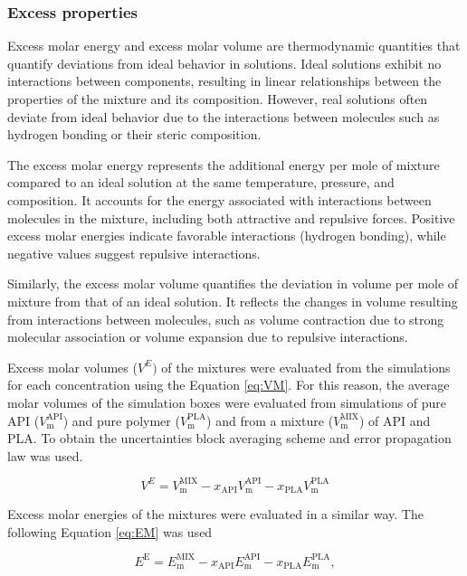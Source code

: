 \newpage
\subsubsection{Excess properties}
Excess molar energy and excess molar volume are thermodynamic quantities that quantify deviations from ideal behavior in solutions. Ideal solutions exhibit no interactions between components, resulting in linear relationships between the properties of the mixture and its composition. However, real solutions often deviate from ideal behavior due to the interactions between molecules such as hydrogen bonding or their steric composition.

The excess molar energy represents the additional energy per mole of mixture compared to an ideal solution at the same temperature, pressure, and composition. It accounts for the energy associated with interactions between molecules in the mixture, including both attractive and repulsive forces. Positive excess molar energies indicate favorable interactions (hydrogen bonding), while negative values suggest repulsive interactions.

Similarly, the excess molar volume quantifies the deviation in volume per mole of mixture from that of an ideal solution. It reflects the changes in volume resulting from interactions between molecules, such as volume contraction due to strong molecular association or volume expansion due to repulsive interactions.

Excess molar volumes ($V^{E})$ of the mixtures were evaluated from the simulations for each concentration using the Equation \ref{eq:VM}. For this reason, the average molar volumes of the simulation boxes were evaluated from simulations of pure API ($V_{\text{m}}^{\text{API}} $) and pure polymer ($V_{\text{m}}^{\text{PLA}}$) and from a mixture ($V_{\text{m}}^{\text{MIX}}$) of API and PLA. To obtain the uncertainties block averaging scheme and error propagation law was used.  

\begin{equation}\label{eq:VM}
	V^{E} = V_{\text{m}}^{\text{MIX}} - x_{\text{API}} V_{\text{m}}^{\text{API}} - x_{\text{PLA}} V_{\text{m}}^{\text{PLA}}
\end{equation}

Excess molar energies of the mixtures were evaluated in a similar way. The following Equation \ref{eq:EM} was used

\begin{equation}\label{eq:EM}
	E^\text{E} = E_{\text{m}}^{\text{MIX}} - x_{\text{API}} E_{\text{m}}^{\text{API}} - x_{\text{PLA}} E_{\text{m}}^{\text{PLA}},
\end{equation}

